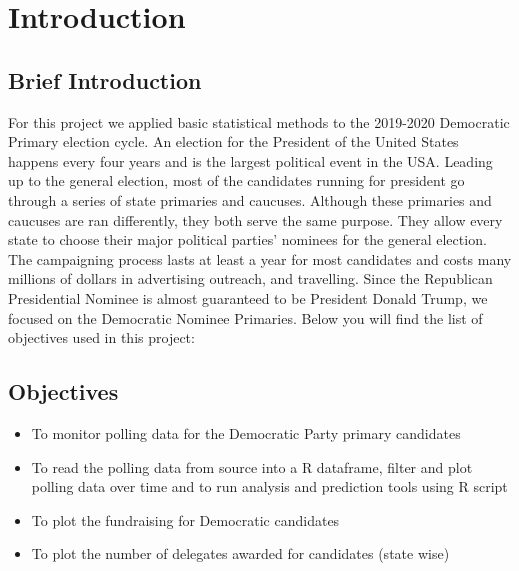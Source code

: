 \section{Introduction}
\subsection{Brief Introduction}
For this project we applied basic statistical methods to the 2019-2020 Democratic Primary election cycle. An election for the President of the United States happens every four years and is the largest political event in the USA. Leading up to the general election, most of the candidates running for president go through a series of state primaries and caucuses. Although these primaries and caucuses are ran differently, they both serve the same purpose. They allow every state to choose their major political parties’ nominees for the general election\cite{usagov}. The campaigning process lasts at least a year for most candidates and costs many millions of dollars in advertising outreach, and travelling. Since the Republican Presidential Nominee is almost guaranteed to be President Donald Trump, we focused on the Democratic Nominee Primaries. Below you will find the list of objectives used in this project:

\subsection{Objectives}
\begin{itemize}
    \item To monitor polling data for the Democratic Party primary candidates
    \item To read the polling data from source into a R dataframe, filter and plot polling data over time and to run analysis and prediction tools using R script 
    \item To plot the fundraising for Democratic candidates
    \item To plot the number of delegates awarded for candidates (state wise)
\end{itemize}


